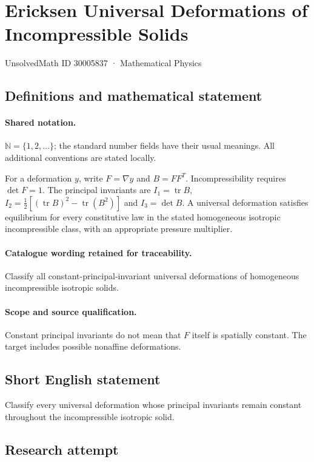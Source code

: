 \documentclass[11pt]{article}
\begin{document}
\setcounter{section}{30005836}
\section{Ericksen Universal Deformations of Incompressible Solids}\label{30005837}
{\small UnsolvedMath ID 30005837 · Mathematical Physics}
\subsection{Definitions and mathematical statement}

\paragraph{Shared notation.}$\mathbb N=\{1,2,\ldots\}$; the standard number fields have their usual meanings. All additional conventions are stated locally.


For a deformation $y$, write $F=\nabla y$ and $B=FF^T$. Incompressibility requires $\det F=1$. The principal invariants are $I_1=\operatorname{tr}B$, $I_2=\tfrac12[(\operatorname{tr}B)^2-\operatorname{tr}(B^2)]$ and $I_3=\det B$. A universal deformation satisfies equilibrium for every constitutive law in the stated homogeneous isotropic incompressible class, with an appropriate pressure multiplier.

\paragraph{Catalogue wording retained for traceability.}
Classify all constant-principal-invariant universal deformations of homogeneous incompressible isotropic solids.

\paragraph{Scope and source qualification.}Constant principal invariants do not mean that $F$ itself is spatially constant. The target includes possible nonaffine deformations.
\subsection{Short English statement}
Classify every universal deformation whose principal invariants remain constant throughout the incompressible isotropic solid.
\subsection{Research attempt}
\end{document}
